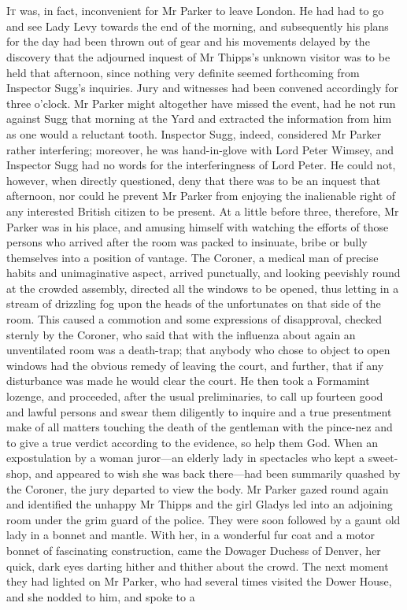 \chapter[Chapter \thechapter]{}
\lettrine[lines=4]{I}{t} was, in fact, inconvenient for Mr Parker to leave London. He had had to go and see Lady Levy towards the end of the morning, and subsequently his plans for the day had been thrown out of gear and his movements delayed by the discovery that the adjourned inquest of Mr Thipps's unknown visitor was to be held that afternoon, since nothing very definite seemed forthcoming from Inspector Sugg's inquiries. Jury and witnesses had been convened accordingly for three o'clock. Mr Parker might altogether have missed the event, had he not run against Sugg that morning at the Yard and extracted the information from him as one would a reluctant tooth. Inspector Sugg, indeed, considered Mr Parker rather interfering; moreover, he was hand-in-glove with Lord Peter Wimsey, and Inspector Sugg had no words for the interferingness of Lord Peter. He could not, however, when directly questioned, deny that there was to be an inquest that afternoon, nor could he prevent Mr Parker from enjoying the inalienable right of any interested British citizen to be present. At a little before three, therefore, Mr Parker was in his place, and amusing himself with watching the efforts of those persons who arrived after the room was packed to insinuate, bribe or bully themselves into a position of vantage. The Coroner, a medical man of precise habits and unimaginative aspect, arrived punctually, and looking peevishly round at the crowded assembly, directed all the windows to be opened, thus letting in a stream of drizzling fog upon the heads of the unfortunates on that side of the room. This caused a commotion and some expressions of disapproval, checked sternly by the Coroner, who said that with the influenza about again an unventilated room was a death-trap; that anybody who chose to object to open windows had the obvious remedy of leaving the court, and further, that if any disturbance was made he would clear the court. He then took a Formamint lozenge, and proceeded, after the usual preliminaries, to call up fourteen good and lawful persons and swear them diligently to inquire and a true presentment make of all matters touching the death of the gentleman with the pince-nez and to give a true verdict according to the evidence, so help them God. When an expostulation by a woman juror\allowbreak---\allowbreak an elderly lady in spectacles who kept a sweet-shop, and appeared to wish she was back there\allowbreak---\allowbreak had been summarily quashed by the Coroner, the jury departed to view the body. Mr Parker gazed round again and identified the unhappy Mr Thipps and the girl Gladys led into an adjoining room under the grim guard of the police. They were soon followed by a gaunt old lady in a bonnet and mantle. With her, in a wonderful fur coat and a motor bonnet of fascinating construction, came the Dowager Duchess of Denver, her quick, dark eyes darting hither and thither about the crowd. The next moment they had lighted on Mr Parker, who had several times visited the Dower House, and she nodded to him, and spoke to a 